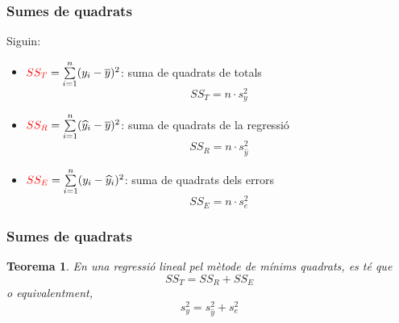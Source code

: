 \documentclass[12pt,t]{beamer}
\newcommand{\red}[1]{\textcolor{red}{#1}}
\theoremstyle{plain}
\newtheorem{teorema}{Teorema}
\theoremstyle{definition}
\begin{document}
\begin{frame}
\frametitle{Sumes de quadrats}
Siguin:
\begin{itemize}
\item $\red{SS_T} =\sum\limits_{i=1}^n(y_i-\overline{y})^2$: suma de quadrats de totals
$$
SS_T=n\cdot s_y^2
$$

\item $\red{SS_R}=\sum\limits_{i=1}^n(\widehat{y}_i-\overline{y})^2$: suma de quadrats de la regressió 
$$
SS_R=n\cdot s_{\widehat{y}}^2
$$

\item $\red{SS_E}=\sum\limits_{i=1}^n(y_i-\widehat{y}_i)^2$: suma de quadrats dels errors
$$
SS_E=n\cdot s_e^2
$$
\end{itemize}

\end{frame}

\begin{frame}
\frametitle{Sumes de quadrats}

\begin{teorema}
En una regressió lineal pel mètode de mínims quadrats, es té que
$$
SS_T=SS_R+SS_E
$$
o equivalentment,
$$
s^2_y=s^2_{\widehat{y}}+s^2_e
$$
\end{teorema}

\end{frame}
%
%
%
%
%
%
%
\end{document}
